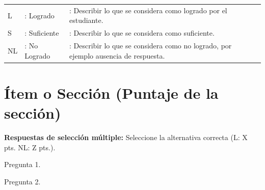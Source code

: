 \documentclass{exam}
\begin{document}
\begin{table}[H]
    {\small
    \begin{tabular}{lll}
        L  & : Logrado    & : Describir lo que se considera como logrado por el estudiante. \\
        S  & : Suficiente & : Describir lo que se considera como suficiente. \\
        NL & : No Logrado & : Describir lo que se considera como no logrado, por ejemplo ausencia de respuesta.
    \end{tabular}}
\end{table}

\vspace{-7mm}
\section{\textbf{\'Item o Secci\'on (Puntaje de la secci\'on)}}
\noindent
\textbf{Respuestas de selecci\'on m\'ultiple: } Seleccione la alternativa correcta (L: X pts. NL: Z pts.).

\begin{questions}

    \question Pregunta 1.

    \question Pregunta 2.
    
\end{questions}
\end{document}
